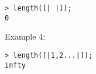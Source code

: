 \begin{center}\begin{minipage}{15cm}\begin{Verbatim}[frame=single,commandchars=\\\|\~]
> length([| |]);
0
\end{Verbatim}
\end{minipage}\end{center}
\noindent Example 4: 
\begin{center}\begin{minipage}{15cm}\begin{Verbatim}[frame=single,commandchars=\\\|\~]
> length([|1,2...|]);
infty
\end{Verbatim}
\end{minipage}\end{center}
